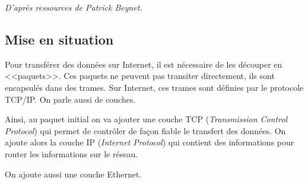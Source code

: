 \documentclass[10pt]{article}
\begin{document}

\begin{flushright}
\textit{D'après ressources de Patrick Beynet.}
\end{flushright}

 \renewcommand{\baselinestretch}{1.2}
\setlength{\parskip}{2ex plus 0.5ex minus 0.2ex}



\subsection*{Mise en situation}
Pour transférer des données sur Internet, il est nécessaire de les découper en <<paquets>>.
Ces paquets ne peuvent pas transiter directement, ils sont encapsulés dans des trames. Sur Internet, ces trames sont définies par le protocole TCP/IP. On parle aussi de couches.

Ainsi, au paquet initial on va ajouter une couche TCP (\textit{Transmission Control Protocol}) qui permet de contrôler de façon fiable le transfert des données. On ajoute alors la couche IP (\textit{Internet Protocol}) qui contient des informations pour router les informations sur le réseau.

On ajoute aussi une couche Ethernet.
\end{document}
